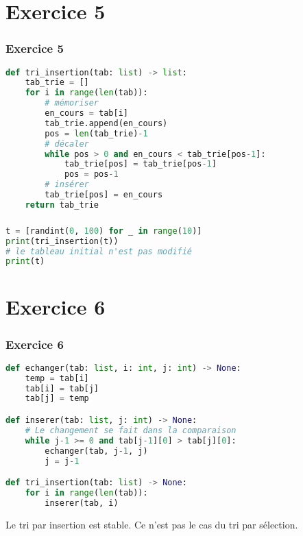\documentclass[svgnames,11pt]{beamer}
\begin{document}
\section{Exercice 5}
\begin{frame}[fragile]
    \frametitle{Exercice 5}
\begin{center}
\begin{lstlisting}[language=Python , basicstyle=\ttfamily\small, xleftmargin=0.2em, xrightmargin=-2em]
def tri_insertion(tab: list) -> list:
    tab_trie = []
    for i in range(len(tab)):
        # mémoriser
        en_cours = tab[i]
        tab_trie.append(en_cours)
        pos = len(tab_trie)-1
        # décaler
        while pos > 0 and en_cours < tab_trie[pos-1]:
            tab_trie[pos] = tab_trie[pos-1]
            pos = pos-1
        # insérer
        tab_trie[pos] = en_cours
    return tab_trie
\end{lstlisting}
\end{center}
    

\end{frame}
\begin{frame}[fragile]
    \frametitle{}

\begin{center}
\begin{lstlisting}[language=Python , basicstyle=\ttfamily\small, xleftmargin=2em, xrightmargin=2em]
t = [randint(0, 100) for _ in range(10)]
print(tri_insertion(t))
# le tableau initial n'est pas modifié
print(t)
\end{lstlisting}
\end{center}

\end{frame}
\section{Exercice 6}
\begin{frame}[fragile]
    \frametitle{Exercice 6}

\begin{center}
\begin{lstlisting}[language=Python , basicstyle=\ttfamily\small, xleftmargin=2em, xrightmargin=2em]
def echanger(tab: list, i: int, j: int) -> None:
    temp = tab[i]
    tab[i] = tab[j]
    tab[j] = temp

def inserer(tab: list, j: int) -> None:
    # Le changement se fait dans la comparaison
    while j-1 >= 0 and tab[j-1][0] > tab[j][0]:
        echanger(tab, j-1, j)
        j = j-1

def tri_insertion(tab: list) -> None:
    for i in range(len(tab)):
        inserer(tab, i)
\end{lstlisting}
\end{center}    
\begin{aretenir}[]
Le tri par insertion est stable. Ce n'est pas le cas du tri par sélection.
\end{aretenir}
\end{frame}
\end{document}
